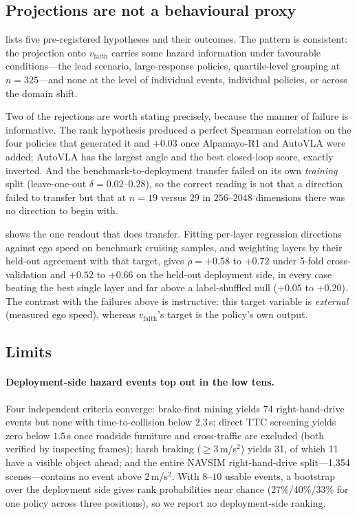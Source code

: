 \subsection{Projections are not a behavioural proxy}
\label{sec:negative}



 lists five pre-registered hypotheses and their outcomes. The pattern is
consistent: the projection onto $v_{\mathrm{faith}}$ carries some hazard information under
favourable conditions---the lead scenario, large-response policies, quartile-level grouping at
$n{=}325$---and none at the level of individual events, individual policies, or across the
domain shift.

Two of the rejections are worth stating precisely, because the manner of failure is
informative. The rank hypothesis produced a perfect Spearman correlation on the four policies
that generated it and $+0.03$ once Alpamayo-R1 and AutoVLA were added; AutoVLA has the largest
angle and the best closed-loop score, exactly inverted. And the benchmark-to-deployment transfer
failed on its own \emph{training} split (leave-one-out $\delta = 0.02$--$0.28$), so the correct
reading is not that a direction failed to transfer but that at $n{=}19$ versus $29$ in
$256$--$2048$ dimensions there was no direction to begin with.



 shows the one readout that does transfer. Fitting per-layer regression
directions against ego speed on benchmark cruising samples, and weighting layers by their
held-out agreement with that target, gives $\rho = +0.58$ to $+0.72$ under 5-fold
cross-validation and $+0.52$ to $+0.66$ on the held-out deployment side, in every case beating
the best single layer and far above a label-shuffled null ($+0.05$ to $+0.20$). The contrast
with the failures above is instructive: this target variable is \emph{external} (measured ego
speed), whereas $v_{\mathrm{faith}}$'s target is the policy's own output.

\subsection{Limits}
\label{sec:limits}

\paragraph{Deployment-side hazard events top out in the low tens.} Four independent criteria
converge: brake-first mining yields 74 right-hand-drive events but none with time-to-collision
below $2.3$\,s; direct TTC screening yields zero below $1.5$\,s once roadside furniture and
cross-traffic are excluded (both verified by inspecting frames); harsh braking
($\ge 3$\,m/s$^2$) yields 31, of which 11 have a visible object ahead; and the entire NAVSIM
right-hand-drive split---1{,}354 scenes---contains no event above $2$\,m/s$^2$. With $8$--$10$
usable events, a bootstrap over the deployment side gives rank probabilities near chance
(27\%/40\%/33\% for one policy across three positions), so we report no deployment-side ranking.

